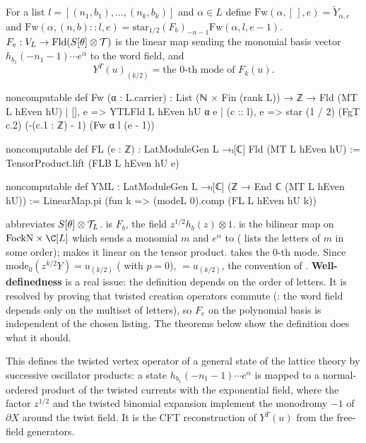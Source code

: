 \begin{definition}\label{ch08:def:FL}
For a list $l=[(n_1,b_1),\dots,(n_k,b_k)]$ and $\alpha\in L$ define
$\mathrm{Fw}(\alpha,[\,],e)=\widetilde Y_{\alpha,e}$ and
$\mathrm{Fw}(\alpha,(n,b)::l,e)=\mathrm{star}_{1/2}(F_b)_{-n-1}\mathrm{Fw}(\alpha,l,e-1)$.
$F_e:V_L\to\mathrm{Fld}(S[\theta]\otimes\mathcal{T})$ is the linear map sending the monomial basis
vector $h_{b_1}(-n_1-1)\cdots e^\alpha$ to the word field, and
\begin{equation*}
  Y^T(u)_{(k/2)}=\text{the $0$-th mode of }F_k(u).
\end{equation*}
\end{definition}
\begin{leancode}
noncomputable def Fw (α : L.carrier) : List (ℕ × Fin (rank L)) → ℤ → Fld (MT L hEven hU)
  | [], e => YTLFld L hEven hU α e
  | (c :: l), e => star (1 / 2) (FgT c.2) (-(c.1 : ℤ) - 1) (Fw α l (e - 1))

noncomputable def FL (e : ℤ) : LatModuleGen L →ₗ[ℂ] Fld (MT L hEven hU) :=
  TensorProduct.lift (FLB L hEven hU e)

noncomputable def YML : LatModuleGen L →ₗ[ℂ] (ℤ → End ℂ (MT L hEven hU)) :=
  LinearMap.pi (fun k => (modeL 0).comp (FL L hEven hU k))
\end{leancode}
\begin{dictionary}
 abbreviates $S[\theta]\otimes\mathcal{T}_L$.   is $F_b$, the field
$z^{1/2}h_b(z)\otimes1$.   is the bilinear map on $\mathrm{FockN}\times\C[L]$ which sends
a monomial $m$ and $e^\alpha$ to  ( lists the letters
of $m$ in some order);  makes it linear on the tensor product.
 takes the $0$-th mode.  Since $\mathrm{mode}_0(z^{k/2}Y)=u_{(k/2)}$ (
with $p=0$),  $=u_{(k/2)}$, the convention of .
\textbf{Well-definedness} is a real issue: the definition depends on the order of letters.  It is
resolved by proving that twisted creation operators commute (: the word field depends
only on the multiset of letters), so $F_e$ on the polynomial basis is independent of the chosen
listing.  The theorems below show the definition does what it should.
\end{dictionary}

\begin{physics}
This defines the twisted vertex operator of a general state of the lattice theory by successive oscillator products: a state $h_{b_1}(-n_1-1)\cdots e^\alpha$ is mapped to a normal-ordered product of the twisted currents with the exponential field, where the factor $z^{1/2}$ and the twisted binomial expansion implement the monodromy $-1$ of $\partial X$ around the twist field. It is the CFT reconstruction of $Y^T(u)$ from the free-field generators.
\end{physics}

